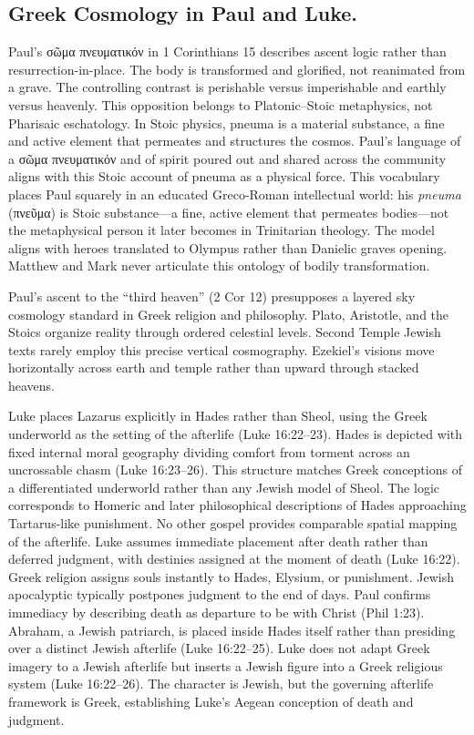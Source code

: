 \subsection{Greek Cosmology in Paul and Luke.}
Paul's σῶμα πνευματικόν in 1 Corinthians 15 describes ascent logic rather than resurrection-in-place.
The body is transformed and glorified, not reanimated from a grave.
The controlling contrast is perishable versus imperishable and earthly versus heavenly.
This opposition belongs to Platonic--Stoic metaphysics, not Pharisaic eschatology.
In Stoic physics, pneuma is a material substance, a fine and active element that permeates and structures the cosmos.
Paul's language of a σῶμα πνευματικόν and of spirit poured out and shared across the community aligns with this Stoic account of pneuma as a physical force.
This vocabulary places Paul squarely in an educated Greco-Roman intellectual world: his \emph{pneuma} (πνεῦμα) is Stoic substance---a fine, active element that permeates bodies---not the metaphysical person it later becomes in Trinitarian theology.
The model aligns with heroes translated to Olympus rather than Danielic graves opening.
Matthew and Mark never articulate this ontology of bodily transformation.

Paul's ascent to the ``third heaven'' (2 Cor 12) presupposes a layered sky cosmology standard in Greek religion and philosophy.
Plato, Aristotle, and the Stoics organize reality through ordered celestial levels.
Second Temple Jewish texts rarely employ this precise vertical cosmography.
Ezekiel's visions move horizontally across earth and temple rather than upward through stacked heavens.

Luke places Lazarus explicitly in Hades rather than Sheol, using the Greek underworld as the setting of the afterlife (Luke 16:22--23).
Hades is depicted with fixed internal moral geography dividing comfort from torment across an uncrossable chasm (Luke 16:23--26).
This structure matches Greek conceptions of a differentiated underworld rather than any Jewish model of Sheol.
The logic corresponds to Homeric and later philosophical descriptions of Hades approaching Tartarus-like punishment.
No other gospel provides comparable spatial mapping of the afterlife.
Luke assumes immediate placement after death rather than deferred judgment, with destinies assigned at the moment of death (Luke 16:22).
Greek religion assigns souls instantly to Hades, Elysium, or punishment.
Jewish apocalyptic typically postpones judgment to the end of days.
Paul confirms immediacy by describing death as departure to be with Christ (Phil 1:23).
Abraham, a Jewish patriarch, is placed inside Hades itself rather than presiding over a distinct Jewish afterlife (Luke 16:22--25).
Luke does not adapt Greek imagery to a Jewish afterlife but inserts a Jewish figure into a Greek religious system (Luke 16:22--26).
The character is Jewish, but the governing afterlife framework is Greek, establishing Luke's Aegean conception of death and judgment.

